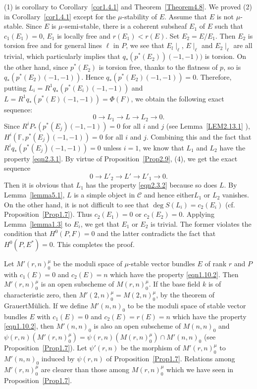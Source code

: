 \begin{Proof}
(1) is corollary to Corollary~\ref{cor1.4.1} and Theorem~\ref{Theorem4.8}. We
proved (2) in Corollary~\ref{cor1.4.1} except for the $\mu$-stability
of $E$. Assume that $E$ is not $\mu$-stable. Since $E$ is
$\mu$-semi-stable, there is a coherent subsheaf $E_1$ of $E$ such that
$c_1(E_1)=0$, $E_1$ is locally free and $r(E_1)<r(E)$. Set
$E_2=E/E_1$. Then $E_2$ is torsion free and for general lines
$\ell$ in $P$, we see that $E_{l}\mid_{\ell}$, $E\mid_{\ell}$ and
$E_{2}\mid_{\ell}$ are all trivial, which particularly implies that
$q_{\ast}(p^{\ast}(E_2))(-1,-1))$ is torsion. On the other hand, since
$p^{\ast}(E_2)$ is torsion free, thanks to the flatness of $p$, so is
$q_{\ast}(p^{\ast}(E_2)(-1,-1))$. Hence
$q_{\ast}(p^{\ast}(E_2)(-1,-1))=0$. Therefore, putting
$L_i=R^{1}q_{\ast}(p^{\ast}(E_i)(-1,-1))$ and
$L=R^{1}q_{\ast}(p^{\ast}(E)(-1,-1))=\Phi(F)$, we obtain the following
exact sequence: 
$$
0\to L_1\to L\to L_2 \to 0.
$$
Since $R^{i}P_{\ast}(p^{\ast}(E_j)(-1,-1))=0$ for all $i$ and $j$ (see
Lemma~\ref{LEM2.13.1} ), $H^{i}(\mathbb{F},p^{\ast}(E_j)(-1,-1))=0$
for all $i$ and $j$. Combining this and the fact that
$R^{i}q_{\ast}(p^{\ast}(E_j)(-1,-1))=0$ unless $i=1$, we know that
$L_1$ and $L_2$ have the property \eqref{eqn2.3.1}. By virtue of
Proposition~\ref{Prop2.9}, (4), we get the exact sequence 
$$
0\to L'_2\to L'\to L'_1\to 0.
$$
Then it is obvious that $L_1$ has the property \eqref{eqn2.3.2}
because so does $L$. By Lemma~\ref{lemma5.1}, $L$ is a simple object
in $\mathscr{C}$ and hence either\pageoriginale $L_1$ or $L_2$ vanishes. On the
other hand, it is not difficult to see that $\deg S(L_i)=c_2(E_i)$
(cf. \cite{key11} Proposition~\ref{Prop1.7}). Thus $c_2(E_1)=0$ or
$c_2(E_2)=0$. Applying Lemma~\ref{lemma1.3} to $E_i$, we get that
$E_1$ or $E_2$ is trivial. The former violates the condition that
$H^{0}(P,F)=0$ and the latter contradicts the fact that
$H^{0}(P,E^{\ast})=0$. This completes the proof.
\end{Proof}

Let $M'(r,n)^{\mu}_0$ be the moduli space of $\mu$-stable vector
bundles $E$ of rank $r$ and $P$ with $c_1(E)=0$ and $c_2(E)=n$ which
have the property \eqref{eqn1.10.2}. Then $M'(r,n)^{\mu}_0$ is an open
subscheme of $M(r,n)^{\mu}_0$. If the base field $k$ is of
characteristic zero, then $M'(2,n)^{\mu}_0=M(2,n)^{\mu}_0$, by the
theorem of GrauertM\"ulich. If we define $M'(n,n)_0$ to be the moduli
space of stable vector bundles $E$ with $c_1(E)=0$ and $c_2(E)=r(E)=n$
which have the property \eqref{eqn1.10.2}, then $M'(n,n)_0$ is also an
open subscheme of $M(n,n)_0$ and $\psi(r,n)(M'(r,n)^{\mu}_0)=
\psi(r,n)(M(r,n)^{\mu}_0)\cap M'(n,n)_0$ (see
Proposition~\ref{Prop1.7}). Let $\psi'(r,n)$ be the morphism of
$M'(r,n)^{\mu}_0$ to $M'(n,n)_0$ induced by $\psi(r,n)$ of
Proposition~\ref{Prop1.7}. Relations among $M'(r,n)^{\mu}_0$ are
clearer than those among $M(r,n)^{\mu}_0$ which we have seen in
Proposition~\ref{Prop1.7}.

